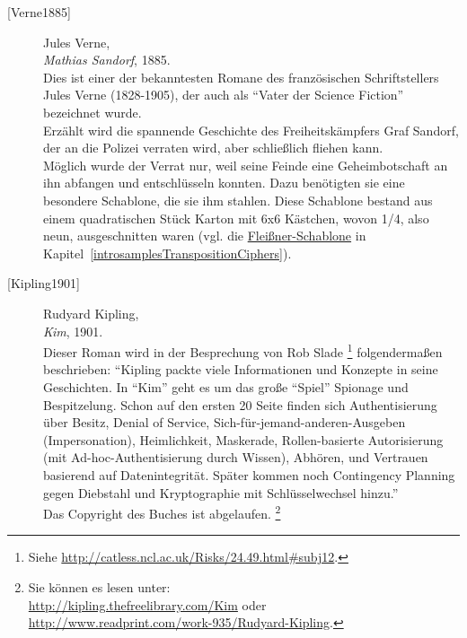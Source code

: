 \begin{description}
\item[\textrm{[Verne1885]}] 
    Jules Verne, \\
    {\em Mathias Sandorf}, 1885. \\
    Dies ist einer der bekanntesten Romane des französischen Schriftstellers
    Jules Verne (1828-1905), der auch als "`Vater der Science Fiction"'
    bezeichnet wurde.\\
    Erzählt wird die spannende Geschichte des Freiheitskämpfers Graf
    Sandorf, der an die Polizei verraten wird, aber schließlich fliehen
    kann.\\
    Möglich wurde der Verrat nur, weil seine Feinde eine Geheimbotschaft an
    ihn abfangen und entschlüsseln konnten. Dazu benötigten sie eine
    besondere Schablone, die sie ihm stahlen. Diese Schablone bestand aus
    einem quadratischen Stück Karton mit 6x6 Kästchen, wovon 1/4, also neun,
    ausgeschnitten waren (vgl. die
    \hyperlink{turning-grille-cipher}{Fleißner-Schablone}
    in Kapitel~\ref{introsamplesTranspositionCiphers}).\\


\item[\textrm{[Kipling1901]}] 
    Rudyard Kipling, \\
    {\em Kim}, 1901. \\
    Dieser Roman wird in der Besprechung von Rob Slade%
    \footnote{Siehe
        \url{http://catless.ncl.ac.uk/Risks/24.49.html#subj12}.
    }
    folgendermaßen beschrieben:
    "`Kipling packte viele Informationen und Konzepte in seine Geschichten.
    In "`Kim"' geht es um das große "`Spiel"' Spionage und Bespitzelung.
    Schon auf den ersten 20 Seite finden sich Authentisierung über Besitz,
    Denial of Service, Sich-für-jemand-anderen-Ausgeben (Impersonation),
    Heimlichkeit, Maskerade, Rollen-basierte Autorisierung (mit
    Ad-hoc-Authentisierung durch Wissen), Abhören, und Vertrauen basierend
    auf Datenintegrität.
    Später kommen noch Contingency Planning gegen Diebstahl und
    Kryptographie mit Schlüsselwechsel hinzu."'\\
    Das Copyright des Buches ist abgelaufen.%
    \footnote{Sie können es lesen unter:\\
          \url{http://kipling.thefreelibrary.com/Kim} oder\\
          \url{http://www.readprint.com/work-935/Rudyard-Kipling}.
    }\\



\end{description}
